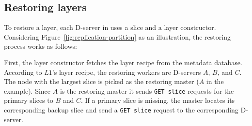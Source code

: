\subsection{Restoring layers}
\label{sec:restore-desgin}





To restore a layer, each D-server in \sysname uses  a slice and a
layer constructor. Considering Figure~\ref{fig:replication-partition} as
an illustration, the restoring process works as follows:

First, the layer constructor fetches the layer recipe from the metadata database.
According to $L1$'s layer recipe,  the restoring workers are D-servers $A$, $B$, and $C$. The node with the largest slice is picked as the restoring master ($A$ in the example).
Since $A$ is the restoring master
it sends \texttt{GET slice} requests for the primary slices to $B$ and $C$.
If a primary slice is missing, the master locates its corresponding backup
slice and send a \texttt{GET slice} request to the corresponding D-server.


